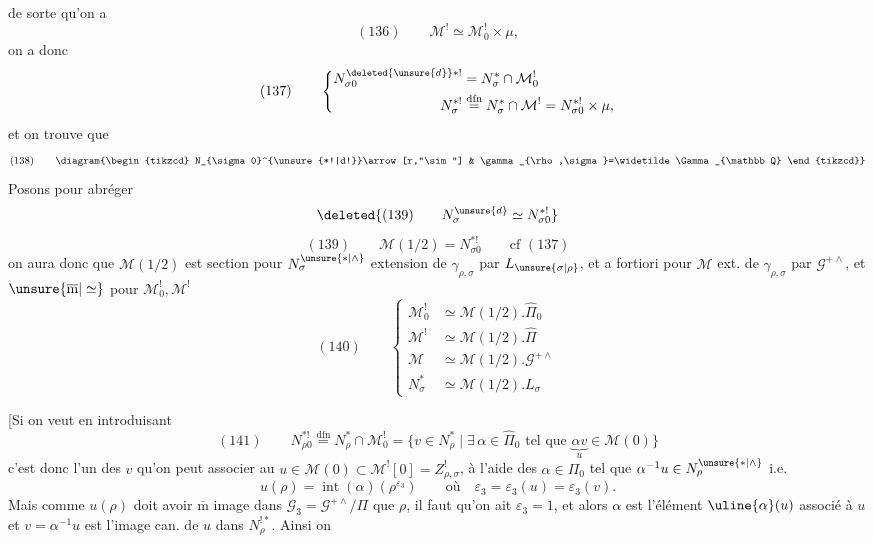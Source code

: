 de sorte qu'on a
\[
 (136)\qquad \mathcal M^!\simeq\mathcal M_0^!\times\mu,
\]
on a donc
\[
 (137)\qquad
 \left\{\begin{aligned}
 N_{\sigma0}^{\deleted{\unsure{d}}*!}&=N^*_{\sigma}\cap\mathcal M_0^!\\
 N_{\sigma}^{*!}&\overset{\mathrm{dfn}}{=}N^*_{\sigma}\cap\mathcal M^!
                    =N_{\sigma0}^{*!}\times\mu,
 \end{aligned}\right.
\]
et on trouve que
\[
 (138)\qquad
 \diagram{\begin{tikzcd}
 N_{\sigma0}^{\unsure{*!|d!}}\arrow[r,"\sim"] &
 \gamma_{\rho,\sigma}=\widetilde\Gamma_{\mathbb Q}
 \end{tikzcd}}
\]
 Posons pour abréger
\[
 \deleted{(139)\qquad N_{\sigma}^{\unsure{d}}\simeq N_{\sigma0}^{*!}}
\]
\[
 (139)\qquad \mathcal M(1/2)=N_{\sigma0}^{*!}\qquad\text{cf }(137)
\]
on aura donc que $\mathcal M(1/2)$ est 
section
 pour $N_{\sigma}^{\unsure{*|\wedge}}$ extension de
$\gamma_{\rho,\sigma}$ par $L_{\unsure{\sigma|\rho}}$, et a fortiori pour
$\mathcal M$ ext. de $\gamma_{\rho,\sigma}$ par $\mathcal G^{+\wedge}$,
et  $\unsure{\overline{\mathrm m}|\simeq}$  pour
$\mathcal M_0^!,\mathcal M^!$
\[
 (140)\qquad
 \left\{\begin{aligned}
 \mathcal M_0^!&\simeq\mathcal M(1/2).\widehat\Pi_0\\
 \mathcal M^!&\simeq\mathcal M(1/2).\widehat\Pi\\
 \mathcal M&\simeq\mathcal M(1/2).\mathcal G^{+\wedge}\\
 N^*_{\sigma}&\simeq\mathcal M(1/2).L_{\sigma}
 \end{aligned}\right.
\]

[Si on veut  en introduisant
\[
 (141)\qquad
 N_{\rho0}^{*!}\overset{\mathrm{dfn}}{=}N^*_{\rho}\cap\mathcal M_0^!
 =\{v\in N^*_{\rho}\mid\exists\,\alpha\in\widehat\Pi_0\text{ tel que }
       \underbrace{\alpha v}_{u}\in\mathcal M(0)\}
\]
c'est donc l'un des $v$ qu'on peut associer au
$u\in\mathcal M(0)\subset\mathcal M^![0]=Z^!_{\rho,\sigma}$,
à l'aide des $\alpha\in\Pi_0$ tel que
$\alpha^{-1}u\in N_{\rho}^{\unsure{*|\wedge}}$ i.e.
\[
 u(\rho)=\operatorname{int}(\alpha)(\rho^{\varepsilon_3})
 \qquad\text{où}\quad\varepsilon_3=\varepsilon_3(u)=\varepsilon_3(v).
\]
Mais comme $u(\rho)$ doit avoir $\overline{\mathrm m}$ image dans
$\mathcal G_3=\mathcal G^{+\wedge}/\Pi$
que $\rho$, il faut qu'on ait $\varepsilon_3=1$, et alors
$\alpha$ est l'élément $\uline{\alpha}(u)$ associé à $u$ et
$v=\alpha^{-1}u$ est l'image can. de $u$ dans $N^{!*}_{\rho}$. Ainsi on


